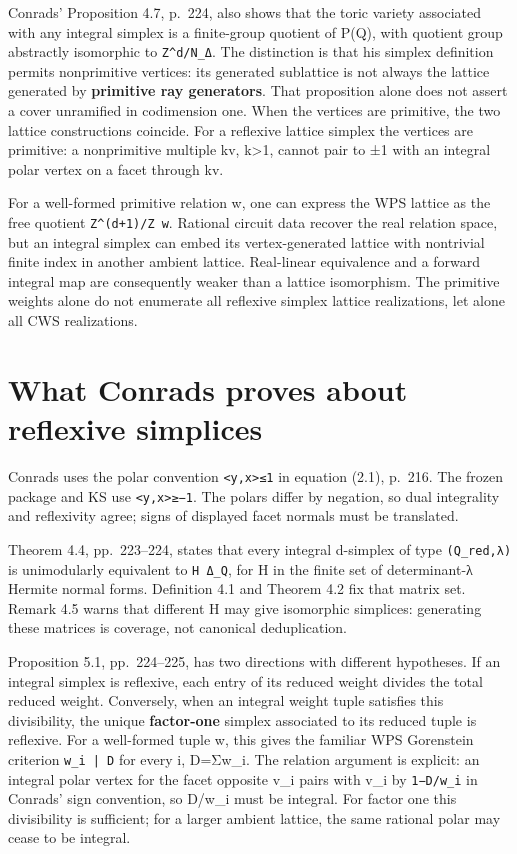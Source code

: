 \documentclass[11pt,a4paper,oneside]{report}
\begin{document}
Conrads' Proposition 4.7, p.~224, also shows that the toric variety
associated with any integral simplex is a finite-group quotient of P(Q),
with quotient group abstractly isomorphic to
\texttt{Z\textasciicircum{}d/\allowbreak{}N\_\allowbreak{}Δ}. The
distinction is that his simplex definition permits nonprimitive
vertices: its generated sublattice is not always the lattice generated
by \textbf{primitive ray generators}. That proposition alone does not
assert a cover unramified in codimension one. When the vertices are
primitive, the two lattice constructions coincide. For a reflexive
lattice simplex the vertices are primitive: a nonprimitive multiple kv,
k\textgreater1, cannot pair to ±1 with an integral polar vertex on a
facet through kv.

For a well-formed primitive relation w, one can express the WPS lattice
as the free quotient
\texttt{Z\textasciicircum{}(\allowbreak{}d+1)\allowbreak{}/\allowbreak{}Z w}.
Rational circuit data recover the real relation space, but an integral
simplex can embed its vertex-generated lattice with nontrivial finite
index in another ambient lattice. Real-linear equivalence and a forward
integral map are consequently weaker than a lattice isomorphism. The
primitive weights alone do not enumerate all reflexive simplex lattice
realizations, let alone all CWS realizations.

\section{What Conrads proves about reflexive
simplices}\label{weight-systems-and-wps--what-conrads-proves-about-reflexive-simplices}

Conrads uses the polar convention \texttt{<y,\allowbreak{}x>≤1} in
equation (2.1), p.~216. The frozen package and KS use
\texttt{<y,\allowbreak{}x>≥−1}. The polars differ by negation, so dual
integrality and reflexivity agree; signs of displayed facet normals must
be translated.

Theorem 4.4, pp.~223--224, states that every integral d-simplex of type
\texttt{(\allowbreak{}Q\_\allowbreak{}red,\allowbreak{}λ)} is
unimodularly equivalent to \texttt{H Δ\_\allowbreak{}Q}, for H in the
finite set of determinant-λ Hermite normal forms. Definition 4.1 and
Theorem 4.2 fix that matrix set. Remark 4.5 warns that different H may
give isomorphic simplices: generating these matrices is coverage, not
canonical deduplication.

Proposition 5.1, pp.~224--225, has two directions with different
hypotheses. If an integral simplex is reflexive, each entry of its
reduced weight divides the total reduced weight. Conversely, when an
integral weight tuple satisfies this divisibility, the unique
\textbf{factor-one} simplex associated to its reduced tuple is
reflexive. For a well-formed tuple w, this gives the familiar WPS
Gorenstein criterion \texttt{w\_\allowbreak{}i | D} for every i,
D=Σw\_i. The relation argument is explicit: an integral polar vertex for
the facet opposite v\_i pairs with v\_i by
\texttt{1−D/\allowbreak{}w\_\allowbreak{}i} in Conrads' sign convention,
so D/w\_i must be integral. For factor one this divisibility is
sufficient; for a larger ambient lattice, the same rational polar may
cease to be integral.
\end{document}
